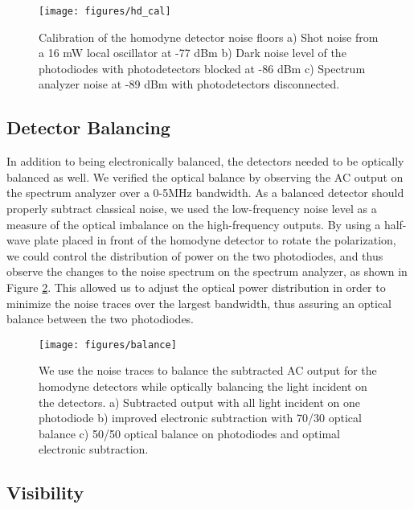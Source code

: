\begin{figure}[!htb] 
 \centering 
 \texttt{[image: figures/hd\_cal]} 
 \caption[Homodyne detection noise floors]{Calibration of the homodyne detector noise floors  a) Shot noise from a 16 mW local oscillator at -77 dBm b) Dark noise level of the photodiodes with photodetectors blocked at -86 dBm c) Spectrum analyzer noise at -89 dBm with photodetectors disconnected.} 
 \label{fig:hd_cal} 
\end{figure}


\subsection{Detector Balancing} 
\label{detector_balancing} 

In addition to being electronically balanced, the detectors needed to be optically balanced as well.  We verified the optical balance by observing the AC output on the spectrum analyzer over a 0-5MHz bandwidth.  As a balanced detector should properly subtract classical noise, we used the low-frequency noise level as a measure of the optical imbalance on the high-frequency outputs.  By using a half-wave plate placed in front of the homodyne detector to rotate the polarization, we could control the distribution of power on the two photodiodes, and thus observe the changes to the noise spectrum on the spectrum analyzer, as shown in Figure \ref{fig:homo_balance}.  This allowed us to adjust the optical power distribution in order to minimize the noise traces over the largest bandwidth, thus assuring an optical balance between the two photodiodes.

\begin{figure}[!ht] 
 \centering 
 \texttt{[image: figures/balance]} 
 \caption[Homodyne detector optical balancing]{We use the noise traces to balance the subtracted AC output for the homodyne detectors while optically balancing the light incident on the detectors.  a) Subtracted output with all light incident on one photodiode b) improved electronic subtraction with 70/30 optical balance c) 50/50 optical balance on photodiodes and optimal electronic subtraction.} 
 \label{fig:homo_balance} 
\end{figure}
 
\subsection{Visibility} 
\label{visibility} 

